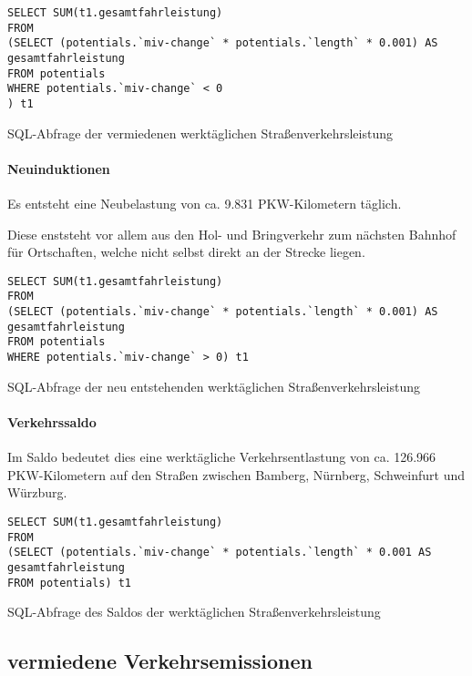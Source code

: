 \documentclass[fontsize=12pt,a4paper]{scrreprt}
\begin{document}
\begin{listing}[htbp]
\begin{verbatim}
SELECT SUM(t1.gesamtfahrleistung)  
FROM
(SELECT (potentials.`miv-change` * potentials.`length` * 0.001) AS gesamtfahrleistung
FROM potentials
WHERE potentials.`miv-change` < 0
) t1
\end{verbatim}
\caption{SQL-Abfrage der vermiedenen werktäglichen Straßenverkehrsleistung}\label{lst-verm-werktaeglich}
\end{listing}

\paragraph{Neuinduktionen}
Es entsteht eine Neubelastung von ca. 9.831 PKW-Kilometern täglich.

Diese enststeht vor allem aus den Hol- und Bringverkehr zum nächsten Bahnhof für Ortschaften, welche nicht selbst direkt an der Strecke liegen.

\begin{listing}[htbp]
\begin{verbatim}
SELECT SUM(t1.gesamtfahrleistung)  
FROM
(SELECT (potentials.`miv-change` * potentials.`length` * 0.001) AS gesamtfahrleistung
FROM potentials
WHERE potentials.`miv-change` > 0) t1
\end{verbatim}
\caption{SQL-Abfrage der neu entstehenden werktäglichen Straßenverkehrsleistung}\label{lst-neu-werktaeglich}
\end{listing}

\paragraph{Verkehrssaldo}

Im Saldo bedeutet dies eine werktägliche Verkehrsentlastung von ca. 126.966 PKW-Kilometern auf den Straßen zwischen Bamberg, Nürnberg, Schweinfurt und Würzburg.

\begin{listing}[htbp]
\begin{verbatim}
SELECT SUM(t1.gesamtfahrleistung)  
FROM
(SELECT (potentials.`miv-change` * potentials.`length` * 0.001 AS gesamtfahrleistung
FROM potentials) t1
\end{verbatim}
\caption{SQL-Abfrage des Saldos der werktäglichen Straßenverkehrsleistung}\label{lst-neu-werktaeglich}
\end{listing}

\subsection{vermiedene Verkehrsemissionen}
\end{document}
